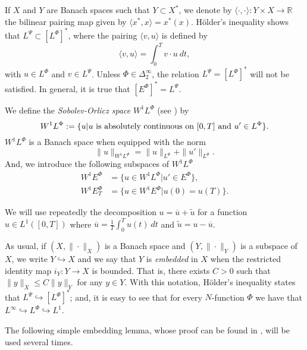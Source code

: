 \documentclass[twoside]{elsarticle}
\theoremstyle{remark}
\newcommand{\orlnor}{\|_{L^{\Phi}}}
\newcommand{\lphi}{L^{\Phi}}
\newcommand{\lpsi}{L^{\Psi}}
\newcommand{\ephi}{E^{\Phi}}
\newcommand{\wphi}{W^{1}\lphi}
\newcommand{\wphie}{W^{1}\ephi}
\renewcommand{\leq}{\leqslant}
\begin{document}
If $X$ and $Y$ are  Banach spaces such that  $Y\subset X^*$, we denote by $\langle\cdot,\cdot\rangle:Y\times X\to\mathbb{R}$ the bilinear pairing  map given by $\langle x^*,x\rangle=x^*(x)$. H\"older's inequality shows that $\lpsi\subset \left[\lphi\right]^*$, where the pairing
$\langle v, u\rangle$
is defined by
\begin{equation}\label{pairing}
  \langle v,u\rangle=\int_0^Tv\cdot u\ dt,
\end{equation}
with  $u\in\lphi$ and $v\in\lpsi$.
 Unless $\Phi \in \Delta_2^{\infty}$, the relation $\lpsi= \left[\lphi\right]^*$ will not be satisfied.
In general, it is true  that  $\left[\ephi\right]^*=\lpsi$.



We define the \emph{Sobolev-Orlicz space} $\wphi$ (see \cite{adams_sobolev}) by
\[\wphi:=\{u| u \hbox{ is absolutely continuous on $[0,T]$ and } u'\in \lphi\}.\]
$\wphi$ is a Banach space when equipped with the norm
\begin{equation}\label{def-norma-orlicz-sob}
\|  u  \|_{\wphi}= \|  u  \|_{\lphi} + \|u'\orlnor.
\end{equation}
And, we introduce the following subspaces of $\wphi$
\begin{equation}\label{def-esp-orlicz-sob-per}
\begin{split}
\wphie&=\{u\in\wphi|u'\in\ephi\},\\
\wphie_T&=\{u\in\wphie|u(0)=u(T)\}.
\end{split}
\end{equation}



We will use repeatedly the decomposition $u=\overline{u}+\widetilde{u}$ for a function $u\in L^1([0,T])$  where $\overline{u} =\frac1T\int_0^T u(t)\ dt$ and $\widetilde{u}=u-\overline{u}$.

As usual, if $(X,\|\cdot\|_X)$ is a Banach space and $(Y,\|\cdot \|_Y)$ is a subspace of $X$,  we write $Y\hookrightarrow X$ and we say that $Y$ is \emph{embedded} in $X$  when the restricted identity map $i_Y:Y\to X$ is bounded. That is, there exists $C>0$ such that
$\|y\|_X\leq C\|y\|_Y$ for any $y\in Y$.  With this notation, H\"older's inequality states that  $\lpsi\hookrightarrow  \left[\lphi\right]^*$; and, it is easy to see that for every $N$-function $\Phi$ we have that $L^{\infty}\hookrightarrow\lphi \hookrightarrow L^1$.




The following simple  embedding lemma, whose proof can be found in \cite{ABGMS2015}, will be used several times.
\end{document}
